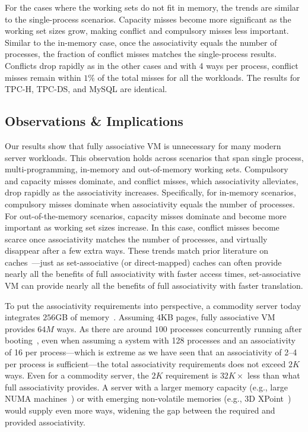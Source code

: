 For the cases where the working sets do not fit in memory, the trends are similar to the single-process scenarios. Capacity misses become more significant as the working set sizes grow, making conflict and compulsory misses less important. Similar to the in-memory case, once the associativity equals the number of processes, the fraction of conflict misses matches the single-process results. Conflicts drop rapidly as in the other cases and with 4 ways per process, conflict misses remain within $1\%$ of the total misses for all the workloads. The results for TPC-H, TPC-DS, and MySQL are identical.

\subsection{Observations \& Implications}

Our results show that fully associative VM is unnecessary for many modern server workloads. This observation holds across scenarios that span single process, multi-programming, in-memory and out-of-memory working sets. Compulsory and capacity misses dominate, and conflict misses, which associativity alleviates, drop rapidly as the associativity increases. Specifically, for in-memory scenarios, compulsory misses dominate when associativity equals the number of processes. For out-of-the-memory scenarios, capacity misses dominate and become more important as working set sizes increase. In this case, conflict misses become scarce once associativity matches the number of processes, and virtually disappear after a few extra ways. These trends match prior literature on caches~\cite{hill:aspects, cantin:cache, hill:case}---just as set-associative (or direct-mapped) caches can often provide nearly all the benefits of full associativity with faster access times, set-associative VM can provide nearly all the benefits of full associativity with faster translation. 

To put the associativity requirements into perspective, a commodity server today integrates $256$GB of memory~\cite{ning:open}. Assuming $4$KB pages, fully associative VM provides $64M$ ways. As there are around $100$ processes concurrently running after booting~\cite{ahn:revising}, even when assuming a system with 128 processes and an associativity of 16 per process---which is extreme as we have seen that an associativity of 2--4 per process is sufficient---the total associativity requirements does not exceed $2K$ ways. Even for a commodity server, the $2K$ requirement is $32K\times$ less than what full associativity provides. A server with a larger memory capacity (e.g., large NUMA machines~\cite{hp:hp, huawei:kunlun}) or with emerging non-volatile memories (e.g., 3D XPoint~\cite{3dxpoint}) would supply even more ways, widening the gap between the required and provided associativity. 



